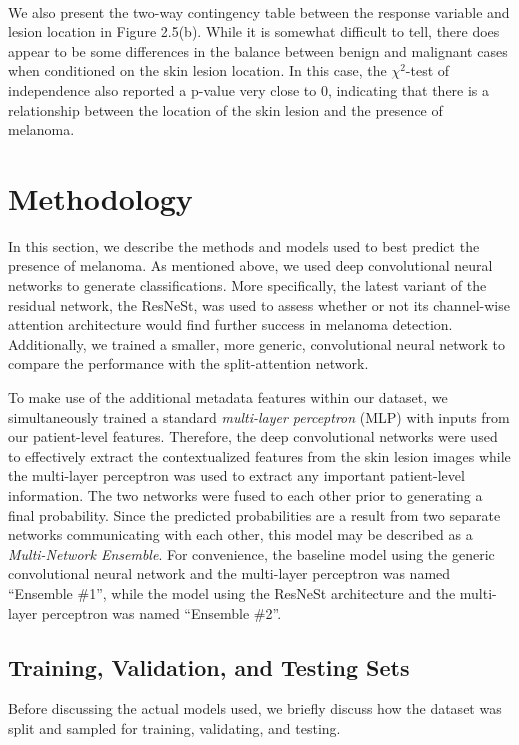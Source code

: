 \documentclass [MAS] {uclathes}
\begin{document}
\ 

We also present the two-way contingency table between the response variable and lesion location in Figure 2.5(b). While it is somewhat difficult to tell, there does appear to be some differences in the balance between benign and malignant cases when conditioned on the skin lesion location. In this case, the $\chi^2$-test of independence also reported a p-value very close to 0, indicating that there is a relationship between the location of the skin lesion and the presence of melanoma.


\chapter{Methodology}

In this section, we describe the methods and models used to best predict the presence of melanoma. As mentioned above, we used deep convolutional neural networks to generate classifications. More specifically, the latest variant of the residual network, the ResNeSt, was used to assess whether or not its channel-wise attention architecture would find further success in melanoma detection. Additionally, we trained a smaller, more generic, convolutional neural network to compare the performance with the split-attention network. 

To make use of the additional metadata features within our dataset, we simultaneously trained a standard \textit{multi-layer perceptron} (MLP) with inputs from our patient-level features. Therefore, the deep convolutional networks were used to effectively extract the contextualized features from the skin lesion images while the multi-layer perceptron was used to extract any important patient-level information. The two networks were fused to each other prior to generating a final probability. Since the predicted probabilities are a result from two separate networks communicating with each other, this model may be described as a \textit{Multi-Network Ensemble}. For convenience, the baseline model using the generic convolutional neural network and the multi-layer perceptron was named ``Ensemble \#1'', while the model using the ResNeSt architecture and the multi-layer perceptron was named ``Ensemble \#2''.

\section{Training, Validation, and Testing Sets}

Before discussing the actual models used, we briefly discuss how the dataset was split and sampled for training, validating, and testing.
\end{document}
